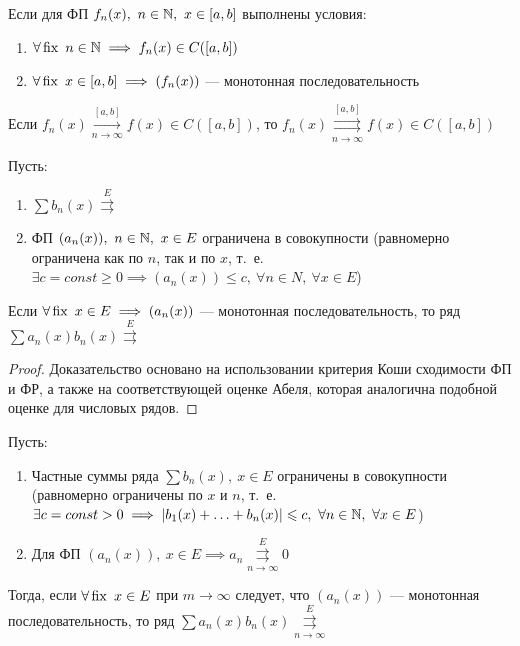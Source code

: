 \documentclass[../../main.tex]{subfiles}
\begin{document}
\begin{thm}
Если для ФП $f_n(x),\ n \in \mathbb{N},\ x \in [a,b]$ выполнены условия:
	\begin{enumerate}
		\item $\forall \operatorname{fix} \ n \in \mathbb{N} \implies
		f_n(x) \in C([a,b])$
		\item $\forall \operatorname{fix} \ x \in [a,b] \implies
		(f_n(x))$ --- монотонная последовательность 
	\end{enumerate}			
Если $f_n(x) \overset{[a,b]}
{\underset{n \to \infty}\longrightarrow} f(x) \in C([a,b])$, то
$f_n(x) \overset{[a,b]}
{\underset{n \to \infty}\rightrightarrows} f(x) \in C([a,b])$
\end{thm}  

\begin{thm}
Пусть:
\begin{enumerate}
	\item $\sum b_n(x) \overset{E}{\rightrightarrows}$
	\item ФП $(a_n(x)),\ n \in \mathbb{N},\ x \in E$ ограничена 
в совокупности (равномерно ограничена как по $n$, так и по $x$, т.~е.
$\exists c = const \geq 0 \implies (a_n(x)) \leq c,\ 
\forall n \in N, \ \forall x \in E$)
\end{enumerate}
Если $\forall \operatorname{fix} \ x \in E \implies (a_n(x))$ --- монотонная 
последовательность, то ряд $\sum a_n(x)b_n(x) \overset{E}{\rightrightarrows}$
\end{thm}	

\begin{proof}
Доказательство основано на использовании критерия Коши сходимости ФП и ФР,
а также на соответствующей оценке Абеля, которая аналогична подобной оценке
для числовых рядов.	
\end{proof}

\begin{thm}
Пусть:
\begin{enumerate}
	\item Частные суммы ряда $\sum b_n(x),\ x \in E$ 
ограничены в совокупности (равномерно ограничены по $x$ и $n$, 
т.~е. $\exists c = const > 0 \implies |b_1(x) + \ldots + b_n(x)| \leqslant c,\
\forall n \in \mathbb{N},\ \forall x \in E$)
	\item Для ФП $(a_n(x)),\ x \in E \implies a_n 
\overset{E}
{\underset{n \to \infty}\rightrightarrows} 0$
\end{enumerate}
Тогда, если $\forall \operatorname{fix} \ x \in E$ при $m \to \infty$ следует, 
что $(a_n(x))$ --- монотонная последовательность, 
то ряд $\sum a_n(x)b_n(x) \overset{E}
{\underset{n \to \infty}\rightrightarrows}$
\end{thm}
\end{document}
